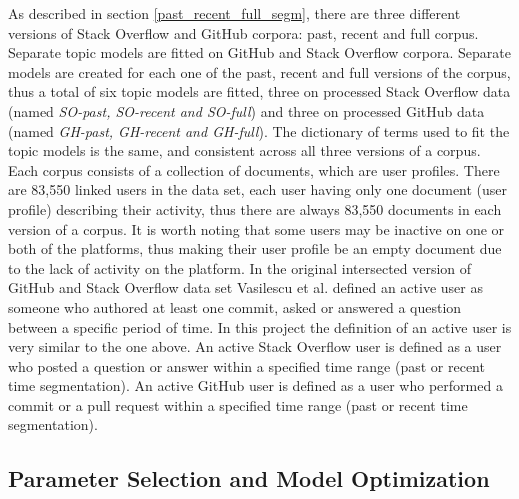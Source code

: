         As described in section \ref{past_recent_full_segm}, there are three different versions of Stack Overflow and GitHub corpora: past, recent and full corpus. Separate topic models are fitted on GitHub and Stack Overflow corpora. Separate models are created for each one of the past, recent and full versions of the corpus, thus a total of six topic models are fitted, three on processed Stack Overflow data (named \emph{SO-past, SO-recent and SO-full}) and three on processed GitHub data (named \emph{GH-past, GH-recent and GH-full}). The dictionary of terms used to fit the topic models is the same, and consistent across all three versions of a corpus. Each corpus consists of a collection of documents, which are user profiles. There are 83,550 linked users in the data set, each user having only one document (user profile) describing their activity, thus there are always 83,550 documents in each version of a corpus. It is worth noting that some users may be inactive on one or both of the platforms, thus making their user profile be an empty document due to the lack of activity on the platform. In the original intersected version of GitHub and Stack Overflow data set Vasilescu et al. \cite{vasilescu2013stackoverflow} defined an active user as someone who authored at least one commit, asked or answered a question between a specific period of time. In this project the definition of an active user is very similar to the one above. An active Stack Overflow user is defined as a user who posted a question or answer within a specified time range (past or recent time segmentation). An active GitHub user is defined as a user who performed a commit or a pull request within a specified time range (past or recent time segmentation).
    
    \subsection{Parameter Selection and Model Optimization}
    

